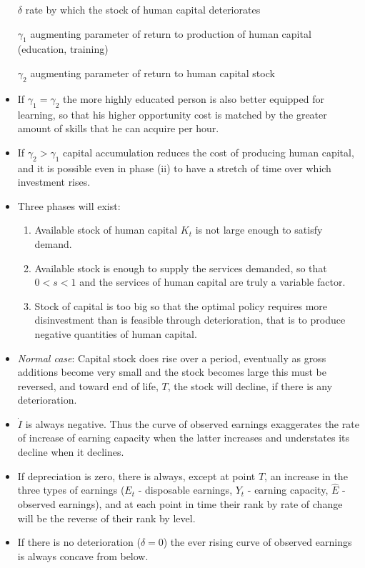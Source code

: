 \documentclass[12pt,a4paper]{article}
\begin{document}
  \begin{itemize}
    \item[$\delta$] rate by which the stock of human capital deteriorates
    \item[$\gamma_1$] augmenting parameter of return to production of human capital (education, training)
    \item[$\gamma_2$] augmenting parameter of return to human capital stock
    \item If $\gamma _{1} = \gamma _{2}$ the more highly educated person is also better equipped for learning, so that his higher opportunity cost is matched by the greater amount of skills that he can acquire per hour.
    \item If $\gamma _{2} > \gamma _{1}$ capital accumulation reduces the cost of producing human capital, and it is possible even in phase (ii) to have a stretch of time over which investment rises.
    \item Three phases will exist:
      \begin{enumerate}
        \item Available stock of human capital $K_t$ is not large enough to satisfy demand.
        \item Available stock is enough to supply the services demanded, so that $0<s<1$ and the services of human capital are truly a variable factor.
        \item Stock of capital is too big so that the optimal policy requires more disinvestment than is feasible through deterioration, that is to produce negative quantities of human capital.
      \end{enumerate}
    \item \emph{Normal case}: Capital stock does rise over a period, eventually as gross additions become very small and the stock becomes large this must be reversed, and toward end of life, $T$, the stock will decline, if there is any deterioration.
    \item $\dot{I}$ is always negative. Thus the curve of observed earnings exaggerates the rate of increase of earning capacity when the latter increases and understates its decline when it declines.
    \item If depreciation is zero, there is always, except at point $T$, an increase in the three types of earnings ($E_t$ - disposable earnings, $Y_t$ - earning capacity, $\hat{E}$ - observed earnings), and at each point in time their rank by rate of change will be the reverse of their rank by level.
    \item If there is no deterioration ($\delta = 0$) the ever rising curve of observed earnings is always concave from below.
  \end{itemize}
\end{document}

